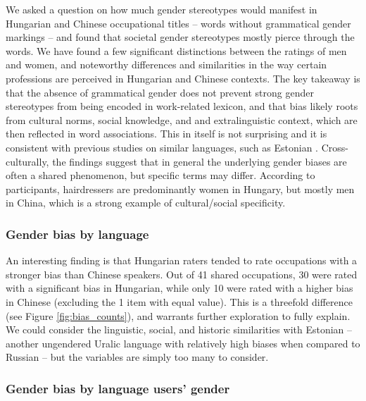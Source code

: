 \documentclass[11pt]{article}
\begin{document}
We asked a question on how much gender stereotypes would manifest in Hungarian and Chinese occupational titles -- words without grammatical gender markings -- and found that societal gender stereotypes mostly pierce through the words. We have found a few significant distinctions between the ratings of men and women, and noteworthy differences and similarities in the way certain professions are perceived in Hungarian and Chinese contexts. The key takeaway is that the absence of grammatical gender does not prevent strong gender stereotypes from being encoded in work-related lexicon, and that bias likely roots from cultural norms, social knowledge, and and extralinguistic context, which are then reflected in word associations. This in itself is not surprising and it is consistent with previous studies on similar languages, such as Estonian \citet{kaukonen_2025_gender}. Cross-culturally, the findings suggest that in general the underlying gender biases are often a shared phenomenon, but specific terms may differ. According to participants, hairdressers are predominantly women in Hungary, but mostly men in China, which is a strong example of cultural/social specificity.

\subsubsection{Gender bias by language}

An interesting finding is that Hungarian raters tended to rate occupations with a stronger bias than Chinese speakers. Out of 41 shared occupations, 30 were rated with a significant bias in Hungarian, while only 10 were rated with a higher bias in Chinese (excluding the 1 item with equal value). This is a threefold difference (see Figure \ref{fig:bias_counts}), and warrants further exploration to fully explain. We could consider the linguistic, social, and historic similarities with Estonian -- another ungendered Uralic language with relatively high biases when compared to Russian \citep{kaukonen_2025_gender} -- but the variables are simply too many to consider. 


\subsubsection{Gender bias by language users' gender}
\end{document}
